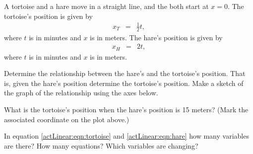 \begin{problem}
\begin{subproblem}
  \end{subproblem}

\clearpage

\item A tortoise and a hare move in a straight line, and the both
  start at $x=0$. The tortoise's position is given by
  \begin{eqnarray}
    \label{actLinear:eqn:tortoise}
    x_T & = & \frac{1}{2} t,
  \end{eqnarray}
  where $t$ is in minutes and $x$ is in meters.  The hare's position
  is given by
  \begin{eqnarray}
    \label{actLinear:eqn:hare}
    x_H & = & 2 t,
  \end{eqnarray}
  where $t$ is in minutes and $x$ is in meters.

  Determine the relationship between the hare's and the tortoise's
  position. That is, given the hare's position determine the
  tortoise's position. Make a sketch of the graph of the relationship using the axes below.



    What is the tortoise's position when the hare's position is 15
    meters? (Mark the associated coordinate on the plot above.)

    In equation \ref{actLinear:eqn:tortoise} and
    \ref{actLinear:eqn:hare} how many variables are there? How many
    equations? Which variables are changing?

\end{problem}


